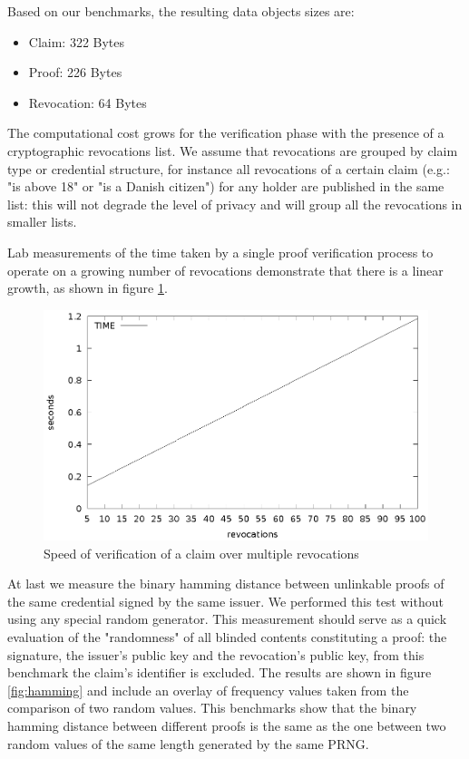 Based on our benchmarks, the resulting data objects sizes are:
\begin{itemize}
    \item Claim: 322 Bytes
    \item Proof:  226 Bytes
    \item Revocation: 64 Bytes
\end{itemize}

The computational cost grows for the verification phase with the presence of a cryptographic revocations list. We assume that revocations are grouped by claim type or credential structure, for instance all revocations of a certain claim (e.g.: "is above 18" or "is a Danish citizen") for any holder are published in the same list: this will not degrade the level of privacy and will group all the revocations in smaller lists.

Lab measurements of the time taken by a single proof verification process to operate on a growing number of revocations demonstrate that there is a linear growth, as shown in figure \ref{fig:verifyrevocations}.

\begin{figure}
    \centering
    \includegraphics[width=1\linewidth]{verifyrevocations.eps}

    \caption{Speed of verification of a claim over multiple revocations}
    \label{fig:verifyrevocations}
\end{figure}

At last we measure the binary hamming distance between unlinkable proofs of the same credential signed by the same issuer. We performed this test without using any special random generator.  This measurement should serve as a quick evaluation of the "randomness" of all blinded contents constituting a proof: the signature, the issuer's public key and the revocation's public key, from this benchmark the claim's identifier is excluded. The results are shown in figure \ref{fig:hamming} and include an overlay of frequency values taken from the comparison of two random values. This benchmarks show that the binary hamming distance between different proofs is the same as the one between two random values of the same length generated by the same PRNG.

